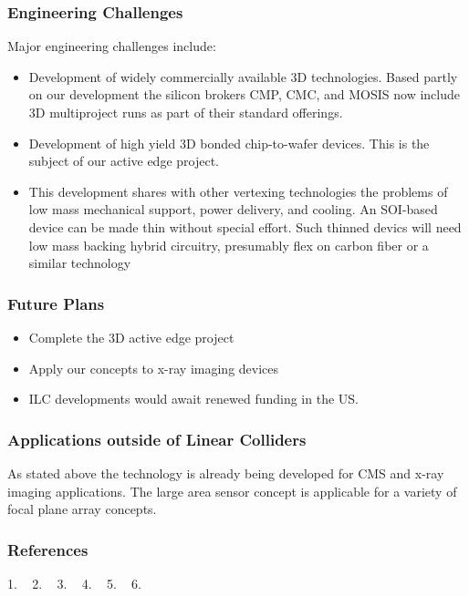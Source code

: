 \subsubsection{Engineering Challenges}
Major  engineering challenges include:
\begin{itemize}
\item Development of widely commercially available 3D technologies.  Based partly on our development the silicon brokers CMP, CMC, and MOSIS now include 3D multiproject runs as part of their standard offerings.
\item Development of high yield 3D bonded chip-to-wafer devices.  This is the subject of our active edge project.
\item This development shares with other vertexing technologies the problems of low mass mechanical support, power delivery, and cooling. An SOI-based device can be made thin without special effort. Such thinned devics will need low mass backing hybrid circuitry, presumably flex on carbon fiber or a similar technology
\end{itemize}

\subsubsection{Future Plans}
\begin{itemize}
\item Complete the 3D active edge project
\item Apply our concepts to x-ray imaging devices
\item ILC developments would await renewed funding in the US.
\end{itemize}

\subsubsection{Applications outside of Linear Colliders}
As stated above the technology is already being developed for CMS and x-ray imaging applications.  The large area sensor concept is applicable for a variety of focal plane array concepts.

\subsubsection{References}

1.  ~\cite{Deptuch:2013ona}
2.  ~\cite{Yarema:2014mva}
3.  ~\cite{MAJ:2013fwa}
4.  ~\cite{2013arXiv1307.4301D}
5.  ~\cite{1748-0221-7-12-C12010}
6.  ~\cite{1748-0221-8-01-C01052}